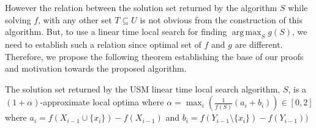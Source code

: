 However the relation between the solution set returned by the algorithm $S$ while solving $f$, with any other set $T\subseteq U$ is not obvious from the construction of this algorithm. But, to use a linear time local search for finding $\operatorname*{arg\,max}_{S} g(S)$, we need to establish such a relation since optimal set of $f$ and $g$ are different. Therefore, we propose the following theorem establishing the base of our proofs and motivation towards the proposed algorithm.
\begin{theorem}
\label{thm:mine}
 The solution set returned by the USM linear time local search algorithm, $S$, is a $(1+\alpha)$-approximate local optima where $\alpha=\max_i(\frac{1}{f(S)}(a_i+b_i))\in [0,2]$ where $a_i = f(X_{i-1}\cup\{x_i\})-f(X_{i-1})$ and $b_i = f(Y_{i-1}\setminus\{x_i\})-f(Y_{i-1}))$
\end{theorem}
